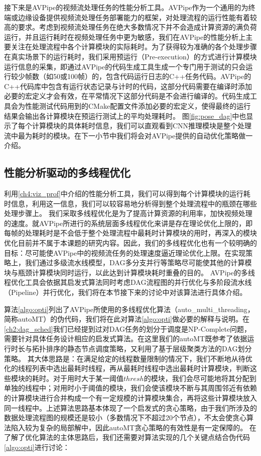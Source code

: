 接下来是AVPipe的视频流处理任务的性能分析工具。AVPipe作为一个通用的为终端或边缘设备提供视频流处理任务部署能力的框架，对处理流程的运行性能有着较高的要求。考虑到视频流处理任务在绝大多数情况下并不会造成计算资源的满负荷运行，并且运行耗时在视频处理任务中更为敏感，我们在AVPipe的性能分析上主要关注在处理流程中各个计算模块的实际耗时。为了获得较为准确的各个处理步骤在真实场景下的运行耗时，我们采用预运行（Pre-execution\cite{kim2002design}）的方式进行计算模块运行信息的采集，即通过AVPipe的代码生成工具生成一个专门用于测试的只会运行较少帧数（如50或100帧）的，包含代码运行日志的C++任务代码。AVPipe的C++代码库中包含有运行状态记录与计时的代码，这部分代码需要在编译时添加必要的宏定义才会有效，在平常情况下这部分代码是不会进行编译的。代码生成工具会为性能测试代码用到的CMake配置文件添加必要的宏定义，使得最终的运行结果会输出各计算模块在预运行测试上的平均处理耗时。
图\ref{fig:pose_dag}中也显示了每个计算模块的具体耗时信息，我们可以直观看到CNN推理模块是整个处理流中最为耗时的模块。在下一小节中我们将会对AVPipe提供的自动优化策略做一介绍。


\subsection{性能分析驱动的多线程优化}\label{ch4:autoMT}
利用\ref{ch4:viz_prof}中介绍的性能分析工具，我们可以得到每个计算模块的运行耗时信息，利用这一信息，我们可以较容易地分析得到整个处理流程中的瓶颈在哪些处理步骤上。
我们采取多线程优化是为了提高计算资源的利用率，加快视频处理的速度。就AVPipe所进行的系统层面多线程优化来讲是存在理论优化上限的，即每帧的处理耗时是不会低于整个处理流程中最耗时计算模块的用时，再深入的模块优化目前并不属于本课题的研究内容。因此，我们的多线程优化也有一个较明确的目标：尽可能使AVPipe中的视频流任务的处理速度逼近理论优化上限。在实现策略上，我们通过多级流水线模型，DAG多分支并行等策略尽可能使其他的计算模块与瓶颈计算模块同时运行，以此达到计算模块耗时重叠的目的。
AVPipe的多线程优化工具会依据其启发式算法同时考虑DAG流程图的并行优化与多阶段流水线（Pipeline）并行优化，我们将在本节接下来的讨论中对该算法进行具体介绍。\par

算法\ref{algo:opti}列出了AVPipe所使用的多线程优化算法（auto\_multi\_threading，简称autoMT）的伪代码，我们将在此对算法\ref{algo:opti}做必要的解释与说明。在\ref{ch2:dag_sched}我们已经提到过对DAG任务的划分于调度是NP-Complete问题，需要针对具体任务设计相应的启发式算法。在这里我们的autoMT既参考了依据运行时长与拓扑排序的静态节点调度策略，又利用了基于层级聚类方法的DAG划分策略。
其大体思路是：在满足给定的线程数量限制的情况下，我们不断地从待优化的线程列表中选出最耗时线程，再从最耗时线程中选出最耗时计算模块，判断这些模块的耗时。对于用时大于某一阈值$thresh$的模块，我们会尽可能地将其分配到单独的线程中；对用时小于阈值的模块，我们会使该模块不断与其周围邻近有依赖的计算模块进行合并构成一个有一定规模的计算模块集合，再将这些计算模块放入同一线程中。上述算法思路基本体现了一个启发式的贪心策略，由于我们所涉及的数据处理流程图的规模还是较小（多数情况下不超过20个节点），不太会使贪心算法陷入较为复杂的局部解中，因此autoMT贪心策略的有效性是有一定保障的。
在了解了优化算法的主体思路后，我们还需要对算法实现的几个关键点结合伪代码\ref{algo:opti}进行讨论：



